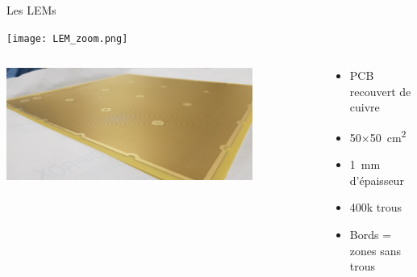     \begin{frame}{Les LEMs}
        \begin{scriptsize}
            \centering\texttt{[image: LEM\_zoom.png]}
            \begin{columns}
                \begin{column}{0.5\textwidth}
                    \centering\includegraphics[width=0.8\textwidth]{./pictures/LEM.png}
                \end{column}
                \begin{column}{0.5\textwidth}
                    \begin{itemize}
                        \item PCB recouvert de cuivre
                        \item 50$\times$\SI{50}{\centi\meter\squared}
                        \item \SI{1}{\milli\meter} d'épaisseur
                        \item 400k trous
                        \item Bords = zones sans trous
                    \end{itemize}
                \end{column}
            \end{columns}
        \end{scriptsize}
    \end{frame}
    
